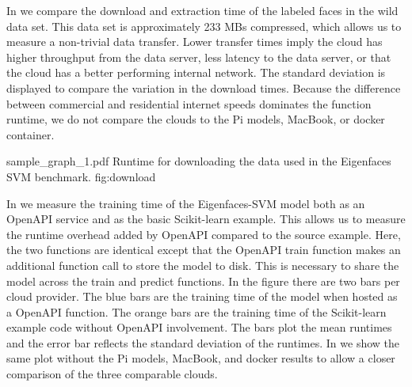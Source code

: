 In  we compare the download and extraction time of the labeled faces in the wild data set. This data set is approximately 233 MBs
compressed, which allows us to measure a non-trivial data transfer.
Lower transfer times imply the cloud has higher throughput from the data
server, less latency to the data server, or that the cloud has a better performing internal network. The standard deviation is displayed to compare the variation in the download times. Because the difference between commercial and residential internet speeds dominates the function runtime, we do not compare the clouds to the Pi models, MacBook, or docker container.

\OneFIGURE
    {sample_graph_1.pdf}
    {Runtime for downloading the data used in the Eigenfaces SVM benchmark.}
    {fig:download}
    
In  we measure the training time of the Eigenfaces-SVM model both as an OpenAPI service and as the basic Scikit-learn example. This
allows us to measure the runtime overhead added by OpenAPI compared to the
source example. Here, the two functions are identical except that the
OpenAPI train function makes an additional function call to store the
model to disk. This is necessary to share the model across
the train and predict functions. In the figure there are two bars per cloud provider. The blue bars are the training time of the model when hosted as a \Cloudmesh OpenAPI function. The
orange bars are the training time of the Scikit-learn example code without \Cloudmesh OpenAPI involvement. The bars plot the mean runtimes and the error bar reflects the standard deviation of the runtimes. In   we show the same plot without the Pi models, MacBook, and docker results to allow a closer comparison of the three comparable clouds.

